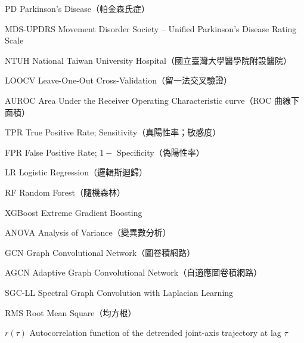 
\begin{denotation}[4cm]


\item[PD]{
  Parkinson's Disease（帕金森氏症）
}

\item[MDS-UPDRS]{
  Movement Disorder Society -- Unified Parkinson's Disease Rating Scale
}

\item[NTUH]{
  National Taiwan University Hospital（國立臺灣大學醫學院附設醫院）
}

\item[LOOCV]{
  Leave-One-Out Cross-Validation（留一法交叉驗證）
}

\item[AUROC]{
  Area Under the Receiver Operating Characteristic curve（ROC 曲線下面積）
}

\item[TPR]{
  True Positive Rate; Sensitivity（真陽性率；敏感度）
}

\item[FPR]{
  False Positive Rate; $1 -$ Specificity（偽陽性率）
}

\item[LR]{
  Logistic Regression（邏輯斯迴歸）
}

\item[RF]{
  Random Forest（隨機森林）
}

\item[XGBoost]{
  Extreme Gradient Boosting
}

\item[ANOVA]{
  Analysis of Variance（變異數分析）
}

\item[GCN]{
  Graph Convolutional Network（圖卷積網路）
}

\item[AGCN]{
  Adaptive Graph Convolutional Network（自適應圖卷積網路）
}

\item[SGC-LL]{
  Spectral Graph Convolution with Laplacian Learning
}

\item[RMS]{
  Root Mean Square（均方根）
}


\item[$r(\tau)$]{
  Autocorrelation function of the detrended joint-axis trajectory at lag $\tau$
}


\end{denotation}
